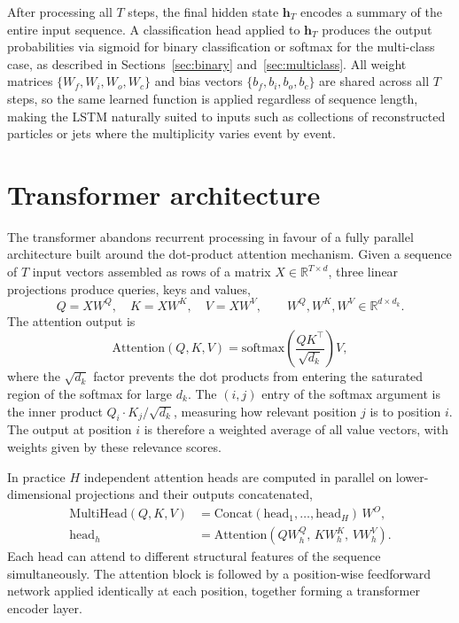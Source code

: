 After processing all $T$ steps, the final hidden state $\mathbf{h}_T$ encodes a summary of the entire input sequence.  A classification head applied to $\mathbf{h}_T$ produces the output probabilities via sigmoid for binary classification or softmax for the multi-class case, as described in Sections~\ref{sec:binary} and~\ref{sec:multiclass}.  All weight matrices $\{W_f, W_i, W_o, W_c\}$ and bias vectors $\{b_f, b_i, b_o, b_c\}$ are shared across all $T$ steps, so the same learned function is applied regardless of sequence length, making the LSTM naturally suited to inputs such as collections of reconstructed particles or jets where the multiplicity varies event by event.

\section{Transformer architecture}

The transformer \cite{Vaswani_Attention_2017} abandons recurrent processing in favour of a fully parallel architecture built around the dot-product attention mechanism.  Given a sequence of $T$ input vectors assembled as rows of a matrix $X\in\mathbb{R}^{T\times d}$, three linear projections produce queries, keys and values,
\begin{equation}
Q = XW^{Q},\quad K = XW^{K},\quad V = XW^{V}, \qquad W^{Q},W^{K},W^{V}\in\mathbb{R}^{d\times d_k}.
\end{equation}
The attention output is
\begin{equation}
\mathrm{Attention}(Q,K,V) = \mathrm{softmax}\!\left(\frac{QK^{\top}}{\sqrt{d_{k}}}\right)V,
\label{eq:attention}
\end{equation}
where the $\sqrt{d_k}$ factor prevents the dot products from entering the saturated region of the softmax for large $d_k$.  The $(i,j)$ entry of the softmax argument is the inner product $Q_i\cdot K_j/\sqrt{d_k}$, measuring how relevant position $j$ is to position $i$.  The output at position $i$ is therefore a weighted average of all value vectors, with weights given by these relevance scores.

In practice $H$ independent attention heads are computed in parallel on lower-dimensional projections and their outputs concatenated,
\begin{equation}
\begin{aligned}
\mathrm{MultiHead}(Q,K,V) &= \mathrm{Concat}(\mathrm{head}_1,\dots,\mathrm{head}_H)\,W^{O}, \\
\mathrm{head}_h &= \mathrm{Attention}(QW_h^Q,\,KW_h^K,\,VW_h^V).
\end{aligned}
\end{equation}
Each head can attend to different structural features of the sequence simultaneously.  The attention block is followed by a position-wise feedforward network applied identically at each position, together forming a transformer encoder layer. 

